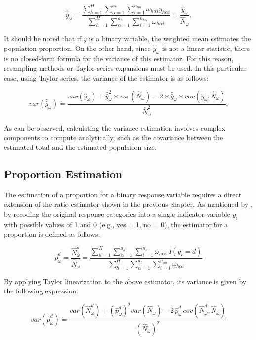 \documentclass[
  12pt,
]{book}
\begin{document}
\[
\hat{\bar{y}}_{\omega} = \frac{\sum_{h=1}^{H}\sum_{\alpha=1}^{a_{h}}\sum_{i=1}^{n_{h\alpha}}\omega_{h\alpha i}y_{h\alpha i}}{\sum_{h=1}^{H}\sum_{\alpha=1}^{a_{h}}\sum_{i=1}^{n_{h\alpha}}\omega_{h\alpha i}} = \frac{\hat{y}_{\omega}}{\hat{N}_{\omega}}.
\]

It should be noted that if \(y\) is a binary variable, the weighted mean estimates the population proportion. On the other hand, since \(\hat{\bar{y}}_{\omega}\) is not a linear statistic, there is no closed-form formula for the variance of this estimator. For this reason, resampling methods or Taylor series expansions must be used. In this particular case, using Taylor series, the variance of the estimator is as follows:

\[
var\left(\hat{\bar{y}}_{\omega}\right) \dot{=} \frac{var\left(\hat{y}_{\omega}\right)+\hat{\bar{y}}_{\omega}^{2}\times var\left(\hat{N}_{\omega}\right)-2\times\hat{\bar{y}}_{\omega}\times cov\left(\hat{y}_{\omega},\hat{N}_{\omega}\right)}{\hat{N}_{\omega}^{2}}.
\]

As can be observed, calculating the variance estimation involves complex components to compute analytically, such as the covariance between the estimated total and the estimated population size.

\subsection{Proportion Estimation}\label{proportion-estimation}

The estimation of a proportion for a binary response variable requires a direct extension of the ratio estimator shown in the previous chapter. As mentioned by \citet{Heeringa_West_Berglund_2017}, by recoding the original response categories into a single indicator variable \(y_{i}\) with possible values of 1 and 0 (e.g., yes = 1, no = 0), the estimator for a proportion is defined as follows:

\[
\hat{p}_{\omega}^d = \frac{\hat{N}^d_{\omega}}{\hat{N}_{\omega}} 
= \frac{\sum_{h=1}^{H}\sum_{\alpha=1}^{a_{h}}\sum_{i=1}^{n_{h\alpha}}\omega_{h\alpha i}\ I(y_i = d)}{\sum_{h=1}^{H}\sum_{\alpha=1}^{a_{h}}\sum_{i=1}^{n_{h\alpha}}\omega_{h\alpha i}}
\]

By applying Taylor linearization to the above estimator, its variance is given by the following expression:

\[
var\left(\hat{p}_{\omega}^d\right) \dot{=} \frac{var\left(\hat{N}^{d}_{\omega}\right)+(\hat{p}_{\omega}^d)^{2}var\left(\hat{N}_{\omega}\right)-2\,\hat{p}_{\omega}^d\,cov\left(\hat{N}^{d}_{\omega},\hat{N}_{\omega}\right)}{(\hat{N}_{\omega})^{2}}
\]
\end{document}
